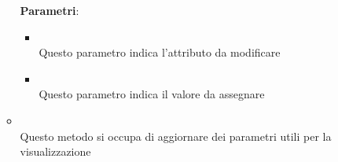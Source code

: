 \begin{itemize}
\begin{itemize}
\textbf{Parametri}:
\begin{itemize}
\item {}
\\ Questo parametro indica l'attributo da modificare

\item {}
\\ Questo parametro indica il valore da assegnare

\end{itemize}
\item {}
\\ Questo metodo si occupa di aggiornare dei parametri utili per la visualizzazione
\end{itemize}
\end{itemize}

